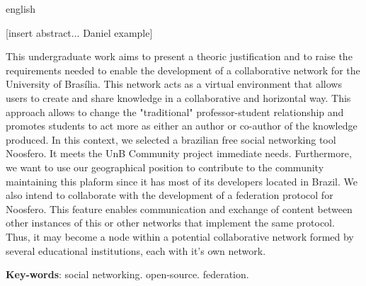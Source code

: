 \begin{resumo}[Abstract]
  \begin{otherlanguage*}{english} 
  
[insert abstract... Daniel example]  
    
  This undergraduate work aims to present a theoric justification and to raise
  the requirements needed to enable the development of a collaborative network for
  the University of Brasília.
  This network acts as a virtual environment that allows users to create and share
  knowledge in a collaborative and horizontal way.
  This approach allows to change the "traditional" professor-student relationship
  and promotes students to act more as either an author or co-author of the
  knowledge produced.
  In this context, we selected a brazilian free social networking tool Noosfero.
  It meets the UnB Community project immediate needs. Furthermore, we want to use
  our geographical position to contribute to the community maintaining this plaform
  since it has most of its developers located in Brazil.
  We also intend to collaborate with the development of a federation protocol for
  Noosfero. This feature enables communication and exchange of content between
  other instances of this or other networks that implement the same protocol.
  Thus, it may become a node within a potential collaborative network formed by
  several educational institutions, each with it’s own network.
   

  \vspace{\onelineskip}
 
  \noindent 
  \textbf{Key-words}: social networking. open-source. federation.
  \end{otherlanguage*}
\end{resumo}


